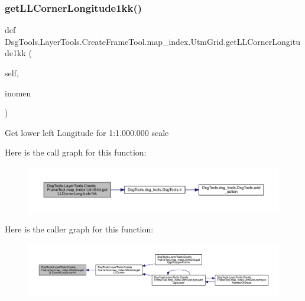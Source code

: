 \subsubsection{\texorpdfstring{get\+L\+L\+Corner\+Longitude1kk()}{getLLCornerLongitude1kk()}}
{\footnotesize\ttfamily def Dsg\+Tools.\+Layer\+Tools.\+Create\+Frame\+Tool.\+map\+\_\+index.\+Utm\+Grid.\+get\+L\+L\+Corner\+Longitude1kk (\begin{DoxyParamCaption}\item[{}]{self,  }\item[{}]{inomen }\end{DoxyParamCaption})}

\begin{DoxyVerb}Get lower left Longitude for 1:1.000.000 scale
\end{DoxyVerb}
 Here is the call graph for this function\+:
\nopagebreak
\begin{figure}[H]
\begin{center}
\leavevmode
\includegraphics[width=350pt]{class_dsg_tools_1_1_layer_tools_1_1_create_frame_tool_1_1map__index_1_1_utm_grid_a1dec1fb206868831867092648f542713_cgraph}
\end{center}
\end{figure}
Here is the caller graph for this function\+:
\nopagebreak
\begin{figure}[H]
\begin{center}
\leavevmode
\includegraphics[width=350pt]{class_dsg_tools_1_1_layer_tools_1_1_create_frame_tool_1_1map__index_1_1_utm_grid_a1dec1fb206868831867092648f542713_icgraph}
\end{center}
\end{figure}
\mbox{\label{class_dsg_tools_1_1_layer_tools_1_1_create_frame_tool_1_1map__index_1_1_utm_grid_a966bc1ef179c687e96a4cd4cca9b20c1}} 
